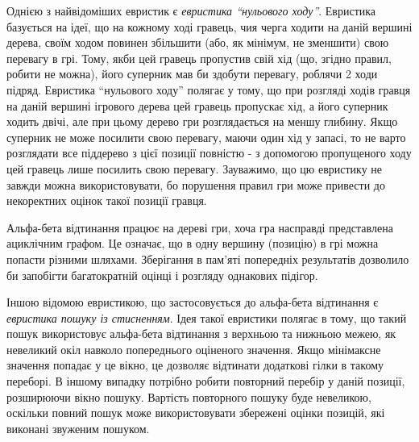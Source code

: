 \documentclass[12pt,a4paper]{article}
\begin{document}
Однією з найвідоміших евристик є \textit{евристика ``нульового
  ходу''}. Евристика базується на ідеї, що на кожному ході гравець, чия черга
ходити на даній вершині дерева, своїм ходом повинен збільшити (або, як
мінімум, не зменшити) свою перевагу в грі. Тому, якби цей гравець пропустив
свій хід (що, згідно правил, робити не можна), його суперник мав би здобути
перевагу, роблячи 2 ходи підряд. Евристика ``нульового ходу'' полягає у тому,
що при розгляді ходів гравця на даній вершині ігрового дерева цей гравець
пропускає хід, а його суперник ходить двічі, але при цьому дерево гри
розглядається на меншу глибину. Якщо суперник не може посилити свою перевагу,
маючи один хід у запасі, то не варто розглядати все піддерево з цієї позиції
повністю - з допомогою пропущеного ходу цей гравець лише посилить свою
перевагу. Зауважимо, що цю евристику не завжди можна використовувати, бо
порушення правил гри може привести до некоректних оцінок такої позиції гравця.

Альфа-бета відтинання працює на дереві гри, хоча гра насправді представлена
ациклічним графом. Це означає, що в одну вершину (позицію) в грі можна попасти
різними шляхами. Зберігання в пам'яті попередніх результатів дозволило би
запобігти багатократній оцінці і розгляду однакових підігор.

Іншою відомою евристикою, що застосовується до альфа-бета відтинання є
\textit{евристика пошуку із стисненням}. Ідея такої евристики полягає в тому,
що такий пошук використовує альфа-бета відтинання з верхньою та нижньою межею,
як невеликий окіл навколо попереднього оціненого значення. Якщо мінімаксне
значення попадає у це вікно, це дозволяє відтинати додаткові гілки в такому
переборі. В іншому випадку потрібно робити повторний перебір у даній позиції,
розширюючи вікно пошуку. Вартість повторного пошуку буде невеликою, оскільки
повний пошук може використовувати збережені оцінки позицій, які виконані
звуженим пошуком.
\end{document}
